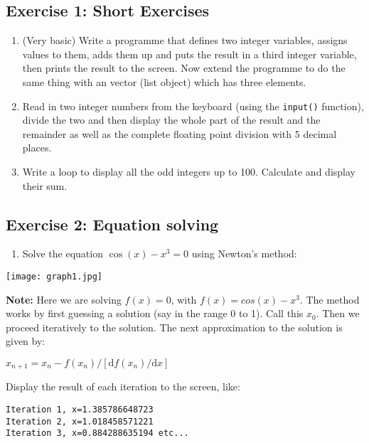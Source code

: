 \documentclass[10pt]{article}
\makeatletter
\def\maxwidth{\ifdim\Gin@nat@width>\linewidth\linewidth
    \else\Gin@nat@width\fi}
\providecommand{\tightlist}{%
      \setlength{\itemsep}{0pt}\setlength{\parskip}{0pt}}
\makeatother
\begin{document}
\hypertarget{exercise-1-short-exercises}{%
\subsection*{Exercise 1: Short
Exercises}\label{exercise-1-short-exercises}}

\begin{enumerate}
\def\labelenumi{\arabic{enumi}.}
\item
  (Very basic) Write a programme that defines two integer variables,
  assigns values to them, adds them up and puts the result in a third
  integer variable, then prints the result to the screen. Now extend the
  programme to do the same thing with an vector (list object) which has
  three elements.
\item
  Read in two integer numbers from the keyboard (using the
  \texttt{input()} function), divide the two and then display the whole
  part of the result and the remainder as well as the complete floating
  point division with 5 decimal places.
\item
  Write a loop to display all the odd integers up to 100. Calculate and
  display their sum.
\end{enumerate}

\hypertarget{exercise-2-equation-solving}{%
\subsection*{Exercise 2: Equation
solving}\label{exercise-2-equation-solving}}

\begin{enumerate}
\def\labelenumi{\arabic{enumi}.}
\tightlist
\item
  Solve the equation \(\cos(x) -x^3 =0\) using Newton's method:
\end{enumerate}

\texttt{[image: graph1.jpg]}

    \textbf{Note:} Here we are solving \(f(x)=0\), with
\(f(x) = cos(x) -x^3\). The method works by first guessing a solution
(say in the range 0 to 1). Call this \(x_0\). Then we proceed
iteratively to the solution. The next approximation to the solution is
given by:

\(x_{n+1}=x_n - f(x_n)/\left[\mathrm{d}f(x_n)/\mathrm{d}x\right]\)

Display the result of each iteration to the screen, like:

\begin{verbatim}
Iteration 1, x=1.385786648723 
Iteration 2, x=1.018458571221 
Iteration 3, x=0.884288635194 etc...
\end{verbatim}
\end{document}
